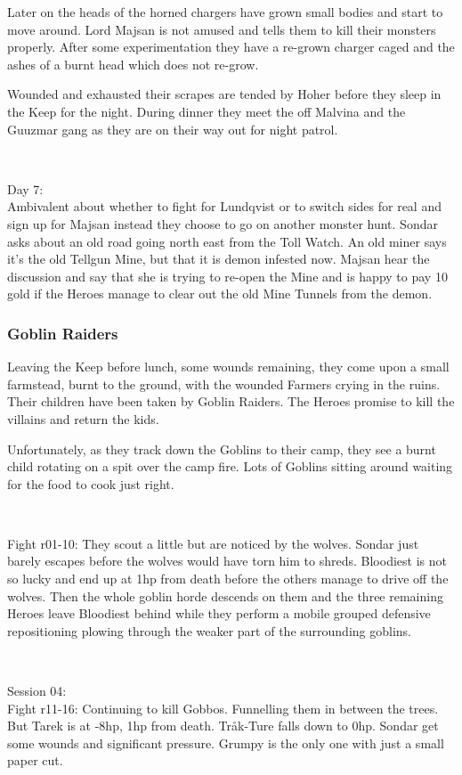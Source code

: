 Later on the heads of the horned chargers have grown small bodies and start to move around. Lord Majsan is not amused and tells them to kill their monsters properly. After some experimentation they have a re-grown charger caged and the ashes of a burnt head which does not re-grow.

Wounded and exhausted their scrapes are tended by Hoher before they sleep in the Keep for the night. During dinner they meet the off Malvina and the Guuzmar gang as they are on their way out for night patrol.

\

Day 7:\\
Ambivalent about whether to fight for Lundqvist or to switch sides for real and sign up for Majsan instead they choose to go on another monster hunt. Sondar asks about an old road going north east from the Toll Watch. An old miner says it's the old Tellgun Mine, but that it is demon infested now. Majsan hear the discussion and say that she is trying to re-open the Mine and is happy to pay 10 gold if the Heroes manage to clear out the old Mine Tunnels from the demon.


\subsubsection*{Goblin Raiders}
Leaving the Keep before lunch, some wounds remaining, they come upon a small farmstead, burnt to the ground, with the wounded Farmers crying in the ruins. Their children have been taken by Goblin Raiders. The Heroes promise to kill the villains and return the kids.

Unfortunately, as they track down the Goblins to their camp, they see a burnt child rotating on a spit over the camp fire. Lots of Goblins sitting around waiting for the food to cook just right.

\

Fight r01-10: They scout a little but are noticed by the wolves. Sondar just barely escapes before the wolves would have torn him to shreds. Bloodiest is not so lucky and end up at 1hp from death before the others manage to drive off the wolves. Then the whole goblin horde descends on them and the three remaining Heroes leave Bloodiest behind while they perform a mobile grouped defensive repositioning plowing through the weaker part of the surrounding goblins.

\

Session 04:\\                                                           %
Fight r11-16: Continuing to kill Gobbos. Funnelling them in between the trees. But Tarek is at -8hp, 1hp from death. Tråk-Ture falls down to 0hp. Sondar get some wounds and significant pressure. Grumpy is the only one with just a small paper cut.

